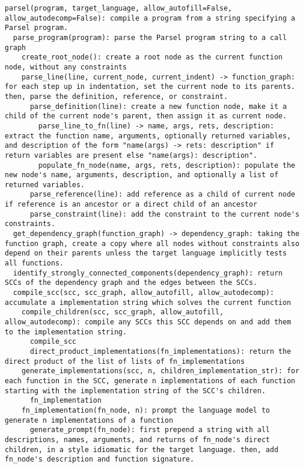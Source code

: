 \begin{figure*}[h]
\begin{lstlisting}[basicstyle=\fontsize{6}{8}\selectfont\ttfamily]
parsel(program, target_language, allow_autofill=False, allow_autodecomp=False): compile a program from a string specifying a Parsel program.
  parse_program(program): parse the Parsel program string to a call graph
    create_root_node(): create a root node as the current function node, without any constraints
    parse_line(line, current_node, current_indent) -> function_graph: for each step up in indentation, set the current node to its parents. then, parse the definition, reference, or constraint.
      parse_definition(line): create a new function node, make it a child of the current node's parent, then assign it as current node.
        parse_line_to_fn(line) -> name, args, rets, description: extract the function name, arguments, optionally returned variables, and description of the form "name(args) -> rets: description" if return variables are present else "name(args): description".
        populate_fn_node(name, args, rets, description): populate the new node's name, arguments, description, and optionally a list of returned variables.
      parse_reference(line): add reference as a child of current node if reference is an ancestor or a direct child of an ancestor
      parse_constraint(line): add the constraint to the current node's constraints.
  get_dependency_graph(function_graph) -> dependency_graph: taking the function graph, create a copy where all nodes without constraints also depend on their parents unless the target language implicitly tests all functions.
  identify_strongly_connected_components(dependency_graph): return SCCs of the dependency graph and the edges between the SCCs.
  compile_scc(scc, scc_graph, allow_autofill, allow_autodecomp): accumulate a implementation string which solves the current function
    compile_children(scc, scc_graph, allow_autofill, allow_autodecomp): compile any SCCs this SCC depends on and add them to the implementation string.
      compile_scc
      direct_product_implementations(fn_implementations): return the direct product of the list of lists of fn_implementations
    generate_implementations(scc, n, children_implementation_str): for each function in the SCC, generate n implementations of each function starting with the implementation string of the SCC's children.
      fn_implementation
    fn_implementation(fn_node, n): prompt the language model to generate n implementations of a function
      generate_prompt(fn_node): first prepend a string with all descriptions, names, arguments, and returns of fn_node's direct children, in a style idiomatic for the target language. then, add fn_node's description and function signature.

\end{lstlisting}
\end{figure*}
